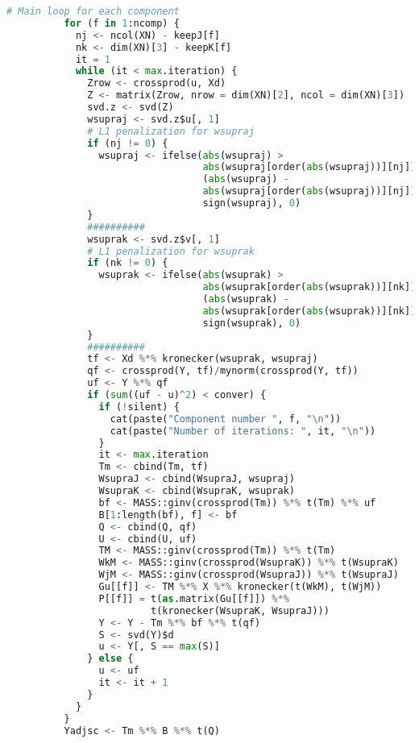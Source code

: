 \begin{scriptsize}
\begin{lstlisting}[language=Python, caption=sNPLS main function]
          # Main loop for each component
          for (f in 1:ncomp) {
            nj <- ncol(XN) - keepJ[f]
            nk <- dim(XN)[3] - keepK[f]
            it = 1
            while (it < max.iteration) {
              Zrow <- crossprod(u, Xd)
              Z <- matrix(Zrow, nrow = dim(XN)[2], ncol = dim(XN)[3])
              svd.z <- svd(Z)
              wsupraj <- svd.z$u[, 1]
              # L1 penalization for wsupraj
              if (nj != 0) {
                wsupraj <- ifelse(abs(wsupraj) > 
                                  abs(wsupraj[order(abs(wsupraj))][nj]),
                                  (abs(wsupraj) - 
                                  abs(wsupraj[order(abs(wsupraj))][nj])) *
                                  sign(wsupraj), 0)
              }
              ##########
              wsuprak <- svd.z$v[, 1]
              # L1 penalization for wsuprak
              if (nk != 0) {
                wsuprak <- ifelse(abs(wsuprak) > 
                                  abs(wsuprak[order(abs(wsuprak))][nk]),
                                  (abs(wsuprak) - 
                                  abs(wsuprak[order(abs(wsuprak))][nk])) *
                                  sign(wsuprak), 0)
              }
              ##########
              tf <- Xd %*% kronecker(wsuprak, wsupraj)
              qf <- crossprod(Y, tf)/mynorm(crossprod(Y, tf))
              uf <- Y %*% qf
              if (sum((uf - u)^2) < conver) {
                if (!silent) {
                  cat(paste("Component number ", f, "\n"))
                  cat(paste("Number of iterations: ", it, "\n"))
                }
                it <- max.iteration
                Tm <- cbind(Tm, tf)
                WsupraJ <- cbind(WsupraJ, wsupraj)
                WsupraK <- cbind(WsupraK, wsuprak)
                bf <- MASS::ginv(crossprod(Tm)) %*% t(Tm) %*% uf
                B[1:length(bf), f] <- bf
                Q <- cbind(Q, qf)
                U <- cbind(U, uf)
                TM <- MASS::ginv(crossprod(Tm)) %*% t(Tm)
                WkM <- MASS::ginv(crossprod(WsupraK)) %*% t(WsupraK)
                WjM <- MASS::ginv(crossprod(WsupraJ)) %*% t(WsupraJ)
                Gu[[f]] <- TM %*% X %*% kronecker(t(WkM), t(WjM))
                P[[f]] = t(as.matrix(Gu[[f]]) %*% 
                         t(kronecker(WsupraK, WsupraJ)))
                Y <- Y - Tm %*% bf %*% t(qf)
                S <- svd(Y)$d
                u <- Y[, S == max(S)]
              } else {
                u <- uf
                it <- it + 1
              }
            }
          }
          Yadjsc <- Tm %*% B %*% t(Q)

\end{lstlisting}
\end{scriptsize}
